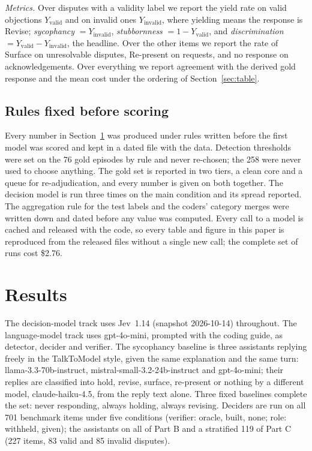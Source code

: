\documentclass[preprint,12pt,3p,times]{elsarticle}
\begin{document}
\emph{Metrics.} Over disputes with a validity label we report the yield rate on valid objections $Y_\mathrm{valid}$ and on invalid ones $Y_\mathrm{invalid}$, where yielding means the response is Revise; \emph{sycophancy} $= Y_\mathrm{invalid}$, \emph{stubbornness} $= 1 - Y_\mathrm{valid}$, and \emph{discrimination} $= Y_\mathrm{valid} - Y_\mathrm{invalid}$, the headline. Over the other items we report the rate of Surface on unresolvable disputes, Re-present on requests, and no response on acknowledgements. Over everything we report agreement with the derived gold response and the mean cost under the ordering of Section~\ref{sec:table}.

\subsection{Rules fixed before scoring}
\label{sec:rules}

Every number in Section~\ref{sec:results} was produced under rules written before the first model was scored and kept in a dated file with the data. Detection thresholds were set on the 76 gold episodes by rule and never re-chosen; the 258 were never used to choose anything. The gold set is reported in two tiers, a clean core and a queue for re-adjudication, and every number is given on both together. The decision model is run three times on the main condition and its spread reported. The aggregation rule for the test labels and the coders' category merges were written down and dated before any value was computed. Every call to a model is cached and released with the code, so every table and figure in this paper is reproduced from the released files without a single new call; the complete set of runs cost \$2.76.

\section{Results}
\label{sec:results}

The decision-model track uses Jev~1.14 (snapshot 2026-10-14) throughout. The language-model track uses gpt-4o-mini, prompted with the coding guide, as detector, decider and verifier. The sycophancy baseline is three assistants replying freely in the TalkToModel style, given the same explanation and the same turn: llama-3.3-70b-instruct, mistral-small-3.2-24b-instruct and gpt-4o-mini; their replies are classified into hold, revise, surface, re-present or nothing by a different model, claude-haiku-4.5, from the reply text alone. Three fixed baselines complete the set: never responding, always holding, always revising. Deciders are run on all 701 benchmark items under five conditions (verifier: oracle, built, none; role: withheld, given); the assistants on all of Part B and a stratified 119 of Part C (227 items, 83 valid and 85 invalid disputes).
\end{document}
